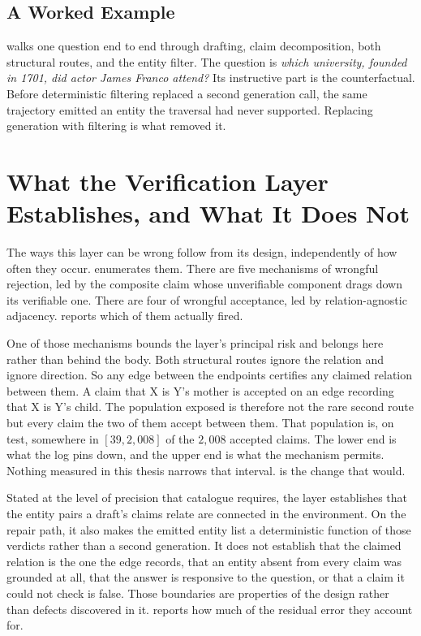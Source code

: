 \subsection{A Worked Example}\label{sec:verify-example}

 walks one question end to end through drafting,
claim decomposition, both structural routes, and the entity filter. The question
is \emph{which university, founded in 1701, did actor James Franco attend?} Its
instructive part is the counterfactual. Before deterministic filtering replaced
a second generation call, the same trajectory emitted an entity the traversal
had never supported. Replacing generation with filtering is what removed it.

\section{What the Verification Layer Establishes, and What It Does
Not}\label{sec:verify-failure-modes}

The ways this layer can be wrong follow from its design, independently of how
often they occur.  enumerates them. There are five
mechanisms of wrongful rejection, led by the composite claim whose unverifiable
component drags down its verifiable one. There are four of wrongful acceptance,
led by relation-agnostic adjacency.  reports which of
them actually fired.

One of those mechanisms bounds the layer's principal risk and belongs here
rather than behind the body. Both structural routes ignore the relation and
ignore direction. So any edge between the endpoints certifies any claimed
relation between them. A claim that X is Y's mother is accepted on an edge
recording that X is Y's child. The population exposed is therefore not the rare
second route but every claim the two of them accept between them. That
population is, on test, somewhere in $[39, 2{,}008]$ of the $2{,}008$ accepted
claims. The lower end is what the log pins down, and the upper end is what the
mechanism permits. Nothing measured in this thesis narrows that interval.
 is the change that would.

Stated at the level of precision that catalogue requires, the layer establishes
that the entity pairs a draft's claims relate are connected in the environment.
On the repair path, it also makes the emitted entity list a deterministic
function of those verdicts rather than a second generation. It does not
establish that the claimed relation is the one the edge records, that an entity
absent from every claim was grounded at all, that the answer is responsive to
the question, or that a claim it could not check is false. Those boundaries are
properties of the design rather than defects discovered in it.
 reports how much of the residual error they account
for.

\endinput
